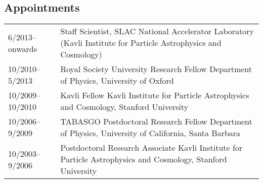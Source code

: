 \subsection*{Appointments}

\begin{tabular}{@{}p{3.5cm}p{14.8cm}}
6/2013--onwards   & Staff Scientist, SLAC National Accelerator Laboratory \newline
                    (Kavli Institute for Particle Astrophysics and Cosmology)\\
10/2010--5/2013   & Royal Society University Research Fellow\newline
                    Department of Physics, University of Oxford\\
10/2009--10/2010  & Kavli Fellow\newline
                    Kavli Institute for Particle Astrophysics and Cosmology, Stanford University\\
10/2006--9/2009   & TABASGO Postdoctoral Research Fellow\newline
                    Department of Physics, University of California, Santa Barbara\\
10/2003--9/2006   & Postdoctoral Research Associate\newline
                    Kavli Institute for Particle Astrophysics and Cosmology, Stanford University\\
\end{tabular}
